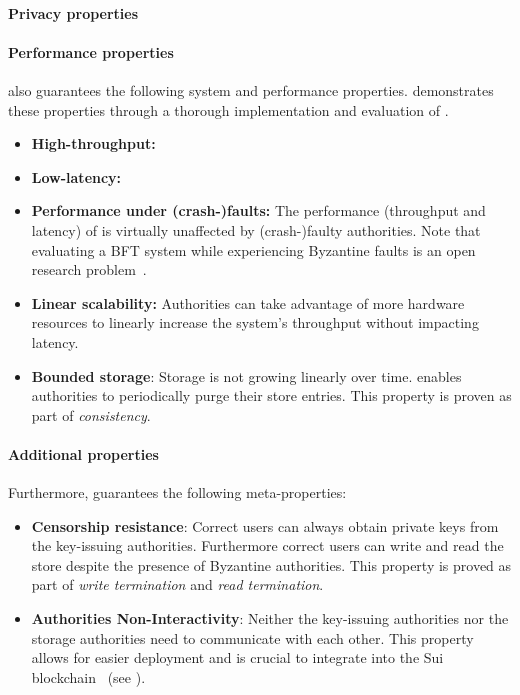 \paragraph{Privacy properties}

\paragraph{Performance properties}
\sysname also guarantees the following system and performance properties.  demonstrates these properties through a thorough implementation and evaluation of \sysname.
\begin{itemize}
    \item \textbf{High-throughput:} 
    \item \textbf{Low-latency:} 
    \item \textbf{Performance under (crash-)faults:} The performance (throughput and latency) of \sysname is virtually unaffected by (crash-)faulty authorities. Note that evaluating a BFT system while experiencing Byzantine faults is an open research problem~\cite{twins}.
    \item \textbf{Linear scalability:} Authorities can take advantage of more hardware resources to linearly increase the system's throughput without impacting latency.
    \item \textbf{Bounded storage}: Storage is not growing linearly over time.
      \sysname enables authorities to periodically purge their store entries.
      This property is proven as part of \emph{consistency}.
\end{itemize}

\paragraph{Additional properties}
Furthermore, \sysname guarantees the following meta-properties:
\begin{itemize}
    \item \textbf{Censorship resistance}: Correct users can always obtain private keys from the key-issuing authorities. Furthermore correct users can write and read the \sysname store despite the presence of Byzantine authorities. This property is proved as part of \emph{write termination} and \emph{read termination}.
    \item \textbf{Authorities Non-Interactivity}: Neither the \sysname key-issuing authorities nor the storage authorities need to communicate with each other. This property allows for easier deployment and is crucial to integrate \sysname into the Sui blockchain~\cite{sui} (see ).
\end{itemize}

